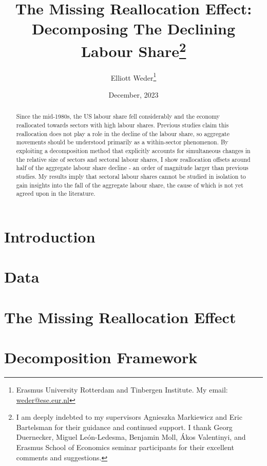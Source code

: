 \documentclass[12pt]{article}
\title{ \vspace*{-2.5cm} \hspace*{-0.5cm} The Missing Reallocation Effect: \\ Decomposing The Declining Labour Share\footnote{
I am deeply indebted to my supervisors Agnieszka Markiewicz and Eric Bartelsman for their guidance and continued support. I thank Georg Duernecker, Miguel Le\'on-Ledesma, Benjamin Moll, \'Akos Valentinyi, and Erasmus School of Economics seminar participants for their excellent comments and suggestions. 
}}
\author{Elliott Weder\thanks{Erasmus University Rotterdam and Tinbergen Institute. My email:
\href{mailto:weder@ese.eur.nl}{weder@ese.eur.nl}}}
\date{ \vspace*{0.5cm} December, 2023\\
}
\begin{document}
\bgroup
\let\footnoterule\relax

\begin{singlespace}
\maketitle
\end{singlespace}

\begin{abstract}
    \noindent Since the mid-1980s, the US labour share fell considerably and the economy reallocated towards sectors with high labour shares. Previous studies claim this reallocation does not play a role in the decline of the labour share, so aggregate movements should be understood primarily as a within-sector phenomenon. By exploiting a decomposition method that explicitly accounts for simultaneous changes in the relative size of sectors and sectoral labour shares, I show reallocation offsets around half of the aggregate labour share decline - an order of magnitude larger than previous studies. My results imply that sectoral labour shares cannot be studied in isolation to gain insights into the fall of the aggregate labour share, the cause of which is not yet agreed upon in the literature. 
\end{abstract}


\thispagestyle{empty}

\clearpage
\egroup
\setcounter{page}{1}



\section{Introduction\label{sec:introduction}}


\section{Data\label{sec:data}}


\section{The Missing Reallocation Effect\label{sec:puzzle}}


\section{Decomposition Framework\label{sec:framework}}

\end{document}
